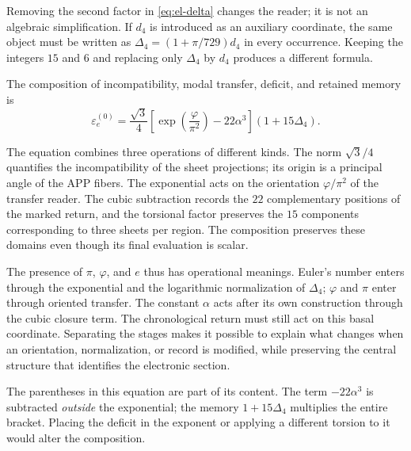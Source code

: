 \begin{remark}
Removing the second factor in \eqref{eq:el-delta} changes the reader; it
is not an algebraic simplification. If \(d_4\) is introduced as an
auxiliary coordinate, the same object must be written as
\(\Delta_4=(1+\pi/729)d_4\) in every occurrence. Keeping the
integers \(15\) and \(6\) and replacing only \(\Delta_4\) by \(d_4\)
produces a different formula.
\end{remark}

\begin{definition}
The composition of incompatibility, modal transfer, deficit, and retained memory
is
\begin{equation}
 \varepsilon_e^{(0)}
 =\frac{\sqrt3}{4}
  \left[\exp\!\left(\frac{\varphi}{\pi^2}\right)-22\alpha^3\right]
  (1+15\Delta_4).
 \label{eq:el-basal}
\end{equation}
\end{definition}

The equation combines three operations of different kinds. The norm
\(\sqrt3/4\) quantifies the incompatibility of the sheet
projections; its origin is a principal angle of the APP fibers.
The exponential acts on the orientation \(\varphi/\pi^2\) of the
transfer reader. The cubic subtraction records the \(22\) complementary
positions of the marked return, and the torsional factor preserves the
\(15\) components corresponding to three sheets per region. The
composition preserves these domains even though its final evaluation is scalar.

The presence of \(\pi\), \(\varphi\), and \(e\) thus has operational
meanings. Euler's number enters through the exponential and
the logarithmic normalization of \(\Delta_4\); \(\varphi\) and \(\pi\)
enter through oriented transfer. The constant \(\alpha\)
acts after its own construction through the cubic closure
term. The chronological return must still act on this basal
coordinate. Separating the stages makes it possible to explain what changes when
an orientation, normalization, or record is modified, while preserving the central
structure that identifies the electronic section.

The parentheses in this equation are part of its content. The term
\(-22\alpha^3\) is subtracted \emph{outside} the exponential; the memory
\(1+15\Delta_4\) multiplies the entire bracket. Placing the deficit in
the exponent or applying a different torsion to it would alter the composition.

